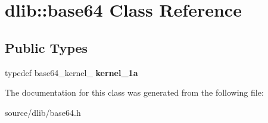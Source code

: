 \hypertarget{classdlib_1_1base64}{
\section{dlib::base64 Class Reference}
\label{classdlib_1_1base64}
}
\subsection*{Public Types}
\begin{DoxyCompactItemize}
\item 
\hypertarget{classdlib_1_1base64_a393d53526eb0f7b4189b93b8eab9f8ed}{
typedef base64\_\-kernel\_ {\bfseries kernel\_\-1a}}
\label{classdlib_1_1base64_a393d53526eb0f7b4189b93b8eab9f8ed}

\end{DoxyCompactItemize}


The documentation for this class was generated from the following file:\begin{DoxyCompactItemize}
\item 
source/dlib/base64.h\end{DoxyCompactItemize}

